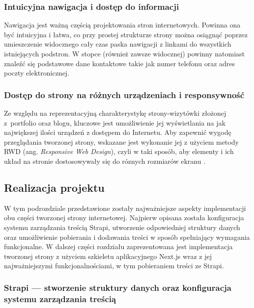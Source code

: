 \documentclass[a4paper, 12pt]{article}
\numberwithin{figure}{section}
\begin{document}
\begin{sloppypar}
\subsubsection*{Intuicyjna nawigacja i dostęp do informacji}

Nawigacja jest ważną częścią projektowania stron internetowych. Powinna ona być intuicyjna i łatwa, co przy prostej strukturze strony można osiągnąć poprzez umieszczenie widocznego cały czas paska nawigacji z linkami do wszystkich istniejących podstron. W stopce (również zawsze widocznej) powinny natomiast znaleźć się podstawowe dane kontaktowe takie jak numer telefonu oraz adres poczty elektronicznej. 

\subsubsection*{Dostęp do strony na różnych urządzeniach i responsywność}

Ze względu na reprezentacyjną charakterystykę strony-wizytówki złożonej z~portfolio oraz blogu, kluczowe jest umożliwienie jej wyświetlania na jak największej ilości urządzeń z dostępem do Internetu. Aby zapewnić wygodę przeglądania tworzonej strony, wskazane jest wykonanie jej z użyciem metody RWD (ang. \textit{Responsive Web Design}), czyli w taki sposób, aby elementy i ich układ na stronie dostosowywały się do róznych rozmiarów ekranu \cite{rwd}. 


\subsection{Realizacja projektu} \label{realizacja}

W tym podrozdziale przedstawione zostały najważniejsze aspekty implementacji obu części tworzonej strony internetowej. Najpierw opisana została konfiguracja systemu zarządzania treścią Strapi, utworzenie odpowiedniej struktury danych oraz umożliwienie pobierania i dodawania treści w sposób spełniający wymagania funkcjonalne. W dalszej części rozdziału zaprezentowana jest implementacja tworzonej strony z użyciem szkieletu aplikacyjnego Next.js wraz z jej najważniejszymi funkcjonalnościami, w tym pobieraniem treści ze Strapi.

\subsubsection{Strapi --- stworzenie struktury danych oraz konfiguracja systemu zarządzania treścią}


\end{sloppypar}
\end{document}
